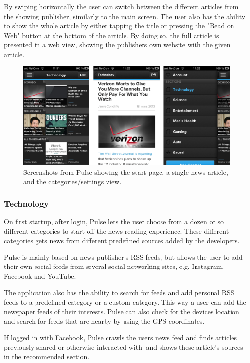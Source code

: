 By swiping horizontally the user can switch between the different articles from the showing publisher, similarly to the main screen. The user also has the ability to show the whole article by either tapping the title or pressing the "Read on Web" button at the bottom of the article. By doing so, the full article is presented in a web view, showing the publishers own website with the given article.

\begin{figure}[!htbp]
\centering
\includegraphics[width=130mm]{GFX/screenshots/pulse.png}
\caption{Screenshots from Pulse showing the start page, a single news article, and the categories/settings view.}
\label{screenshots_pulse}
\end{figure}

\subsubsection{Technology}

On first startup, after login, Pulse lets the user choose from a dozen or so different categories to start off the news reading experience. These different categories gets news from different predefined sources added by the developers. 

Pulse is mainly based on news publisher's RSS feeds, but allows the user to add their own social feeds from several social networking sites, e.g. Instagram, Facebook and YouTube.

The application also has the ability to search for feeds and add personal RSS feeds to a predefined category or a custom category. This way a user can add the newspaper feeds of their interests. Pulse can also check for the devices location and search for feeds that are nearby by using the GPS coordinates.

If logged in with Facebook, Pulse crawls the users news feed and finds articles previously shared or otherwise interacted with, and shows these article's sources in the recommended section.



